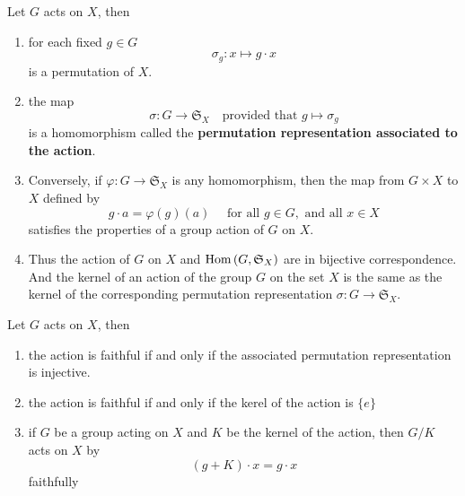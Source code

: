 \begin{proposition}
    \label{proposition: Permutation representation associated to the action}
    Let $G$ acts on $X$, then
    \begin{enumerate}
        \item
              for each fixed $g \in G$
              \begin{equation*}
                  \sigma_g : x\mapsto g\cdot x
              \end{equation*}
              is a permutation of $X$.

        \item  the map
              \begin{equation*}
                  \sigma : G \rightarrow \mathfrak{S}_X \quad \text{provided that } g \mapsto \sigma_g
              \end{equation*}
              is a homomorphism called the \textbf{permutation
                  representation associated to the action}.

        \item Conversely, if $\varphi: G \rightarrow \mathfrak{S}_X$ is any homomorphism, then the map from $G \times X$ to $X$ defined by
              \begin{equation*}
                  g \cdot a=\varphi(g)(a) \quad \text { for all } g \in G, \text { and all } x \in X
              \end{equation*}
              satisfies the properties of a group action of $G$ on $X$.

        \item  Thus the action of $G$ on $X$ and  $\operatorname{\operatorname{Hom}}\left(G,\mathfrak{S}_X\right)$ are in bijective correspondence.
              And the kernel of an action of the group $G$ on the set $X$ is the same as the kernel of the corresponding permutation representation $\sigma : G \rightarrow \mathfrak{S}_X$.
    \end{enumerate}


\end{proposition}


\begin{corollary}
    \label{corollary: The faithness of action}
    Let $G$ acts on $X$, then

    \begin{enumerate}
        \item
              the action is faithful if and only if the associated permutation representation is injective.

        \item
              the action is faithful if and only if the kerel of the action is $\{e\}$

        \item
              if $G$ be a group acting on $X$ and $K$ be the kernel of the action, then $G/K$ acts on $X$ by
              \begin{equation*}
                  (g+K)\cdot x= g\cdot x
              \end{equation*}
              faithfully
    \end{enumerate}
\end{corollary}


